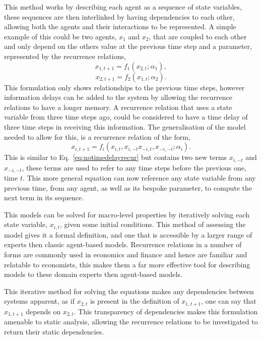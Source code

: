 \documentclass{article}
\begin{document}
This method works by describing each agent as a sequence of state variables, these sequences are then interlinked by having dependencies to each other, allowing both the agents and their interactions to be represented. A simple example of this could be two agents, $x_{1}$ and $x_{2}$, that are coupled to each other and only depend on the others value at the previous time step and a parameter, represented by the recurrence relations,     
\begin{equation}
x_{1, t+1} = f_{1}(x_{2,t}; \alpha_{1}),
\end{equation}
\begin{equation}
x_{2, t+1} = f_{2}(x_{1,t}; \alpha_{2}).
\end{equation}
This formulation only shows relationships to the previous time steps, however information delays can be added to the system by allowing the recurrence relations to have a longer memory. A recurrence relation that uses a state variable from three time steps ago, could be considered to have a time delay of three time steps in receiving this information. The generalisation of the model needed to allow for this, is a recurrence relation of the form, 
\begin{equation}
x_{i, t+1} = f_{i}(x_{i, t}, x_{i, -t} x_{-i,t}, x_{-i, -t}; \alpha_{i}).
\end{equation}
This is similar to Eq.~\ref{eq:notimedelayrecur} but contains two new terms $x_{i, -t}$ and $x_{-i, -t}$, these terms are used to refer to any time steps before the previous one, time $t$. This more general equation can now reference any state variable from any previous time, from any agent, as well as its bespoke parameter, to compute the next term in its sequence.
 
This models can be solved for macro-level properties by iteratively solving each state variable, $x_{i, t}$, given some initial conditions. This method of assessing the model gives it a formal definition, and one that is accessible by a larger range of experts then classic agent-based models. Recurrence relations in a number of forms are commonly used in economics and finance and hence are familiar and relatable to economists, this makes them a far more effective tool for describing models to these domain experts then agent-based models.

This iterative method for solving the equations makes any dependencies between systems apparent, as if $x_{2, t}$ is present in the definition of $x_{1, t+1}$, one can say that $x_{1,t+1}$ depends on $x_{2,t}$. This transparency of dependencies makes this formulation amenable to static analysis, allowing the recurrence relations to be investigated to return their static dependencies.
\end{document}
